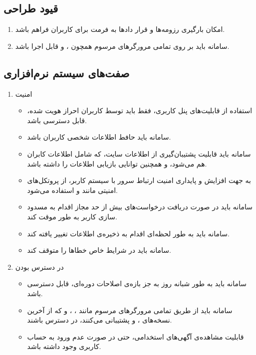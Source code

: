 \documentclass{report}
\begin{document}
			\subsection{قیود طراحی}
			\begin{enumerate}
				\item 
				امکان بارگیری رزومه‌ها و قرار دادها به فرمت  برای کاربران فراهم باشد.
				\item 
				سامانه باید بر روی تمامی مرورگر‌های مرسوم همچون 
				،
				 و
				  قابل اجرا باشد.
			\end{enumerate}
			\subsection{صفت‌های سیستم‌ نرم‌افزاری}
				\begin{enumerate}
					\item امنیت
						\begin{itemize}
							\item 
							استفاده از قابلیت‌های پنل کاربری، فقط باید توسط کاربران احراز هویت شده، قابل دسترسی باشد.
							\item 
							سامانه باید حافط اطلاعات شخصی کاربران باشد.
							\item 
							سامانه باید قابلیت پشتیبان‌گیری از اطلاعات سایت، که شامل اطلاعات کابران هم می‌شود، و همچنین توانایی بازیابی اطلاعات را داشته باشد.
							\item 
							به جهت افزایش و پایداری امنیت ارتباط سرور با سیستم کاربر، از پروتکل‌های امنیتی مانند  و  استفاده می‌شود.
							\item 
							سامانه باید در صورت دریافت درخواست‌های بیش از حد مجاز اقدام به مسدود سازی کاربر به طور موقت کند.
							\item 
							سامانه باید به طور لحظه‌ای اقدام به ذخیره‌ی اطلاعات تغییر یافته کند.
							\item 
							سامانه باید در شرایط خاص خطاها را متوقف کند.
						\end{itemize}
					
					\item در دسترس بودن
						\begin{itemize}
							\item 
							سامانه باید به طور شبانه روز به جز بازه‌ی اصلاحات دوره‌ای، قابل دسترسی باشد.
							\item 
							سامانه باید از طریق تمامی مرورگر‌های مرسوم مانند
							، 
							،
							و
							که از آخرین نسخه‌های 
							،
							و
							پشتیبانی می‌کنند، در دسترس باشند.
							\item
							قابلیت مشاهده‌ی آگهی‌های استخدامی، حتی در صورت عدم ورود به حساب کاربری وجود داشته باشد.
						\end{itemize}
					

\end{enumerate}
\end{document}
